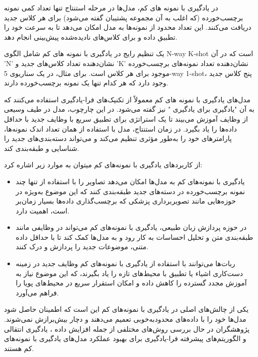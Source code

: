 در یادگیری با نمونه های کم، مدل‌ها در مرحله استنتاج تنها تعداد کمی نمونه برچسب‌خورده (که اغلب به آن مجموعه پشتیبان
 گفته می‌شود) برای هر کلاس جدید دریافت می‌کنند. این تعداد محدود از نمونه‌ها به مدل امکان می‌دهد تا به سرعت خود را تطبیق داده و برای کلاس‌های نادیده‌شده پیش‌بینی انجام دهد.

یک تنظیم رایج در یادگیری با نمونه های کم شامل الگوی N-way K-shot است که در آن 'N' نشان‌دهنده تعداد کلاس‌های جدید و 'K' نشان‌دهنده تعداد نمونه‌های برچسب‌خورده موجود برای هر کلاس است. برای مثال، در یک سناریوی 5-way 1-shot، پنج کلاس جدید وجود دارد که هر کدام تنها یک نمونه برچسب‌خورده دارند.

مدل‌های یادگیری با نمونه های کم معمولاً از تکنیک‌های فرا-یادگیری 
 استفاده می‌کنند که به آن "یادگیری برای یادگیری
 " نیز گفته می‌شود. در این چارچوب، مدل در طیف وسیعی از وظایف آموزش می‌بیند تا یک استراتژی برای تطبیق سریع با وظایف جدید با حداقل داده‌ها را یاد بگیرد. در زمان استنتاج، مدل با استفاده از همان تعداد اندک نمونه‌ها، پارامترهای خود را به‌طور مؤثری تنظیم می‌کند و می‌تواند دسته‌بندی‌های جدید را شناسایی و طبقه‌بندی کند.

از کاربردهای یادگیری با نمونه‌های کم می\/توان به موارد زیر اشاره کرد:
\begin{itemize}
	\item 
	یادگیری با نمونه‌های کم به مدل‌ها امکان می‌دهد تصاویر را با استفاده از تنها چند نمونه برچسب‌خورده در دسته‌های جدید طبقه‌بندی کنند که این موضوع به‌ویژه در حوزه‌هایی مانند تصویربرداری پزشکی که برچسب‌گذاری داده‌ها بسیار زمان‌بر است، اهمیت دارد.
	\item 
	در حوزه پردازش زبان طبیعی، یادگیری با نمونه‌های کم می‌تواند در وظایفی مانند طبقه‌بندی متن و تحلیل احساسات به کار رود و به مدل‌ها کمک کند تا با حداقل داده متنی، موضوعات جدید را پردازش و درک کنند.
	\item 
	ربات‌ها می‌توانند با استفاده از یادگیری با نمونه‌های کم وظایف جدید در زمینه دست‌کاری اشیاء یا تطبیق با محیط‌های تازه را یاد بگیرند، که این موضوع نیاز به آموزش مجدد گسترده را کاهش داده و امکان استقرار سریع در محیط‌های پویا را فراهم می‌آورد.
\end{itemize}

یکی از چالش‌های اصلی در یادگیری با نمونه‌های کم این است که اطمینان حاصل شود مدل‌ها خود را با داده‌های محدودبه‌خوبی تعمیم می‌دهند و دچار بیش‌برازش
 نمی‌شوند. پژوهشگران در حال بررسی روش‌های مختلفی از جمله افزایش داده 
 ، یادگیری انتقالی
  و الگوریتم‌های پیشرفته فرا-یادگیری
   برای بهبود عملکرد مدل‌های یادگیری با نمونه‌های کم هستند.

